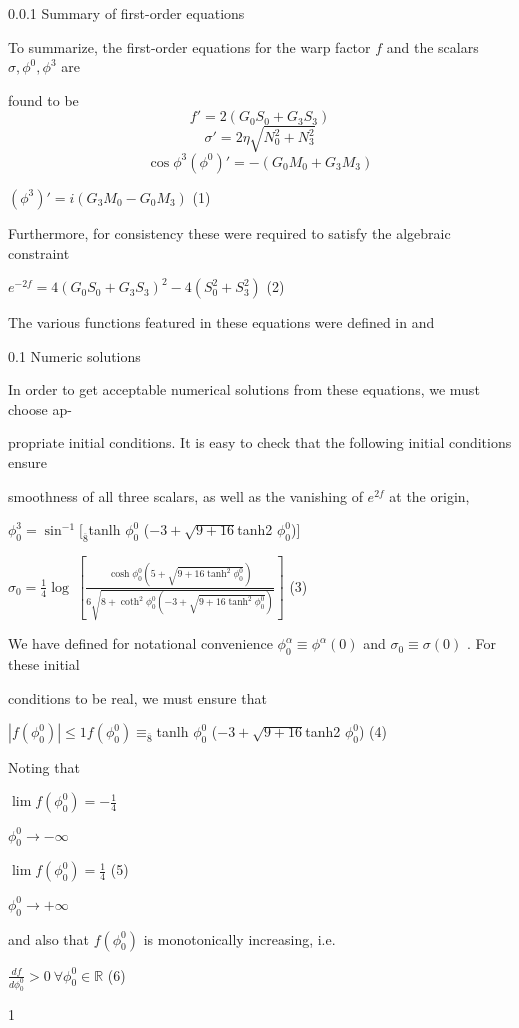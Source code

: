 \documentclass[a4paper,12pt]{article}
\begin{document}
0.0.1 Summary of first-order equations

To summarize, the first-order equations for the warp factor $f$ and the scalars $\sigma, \phi^{0}, \phi^{3}$ are

found to be
$$
f'=2(G_{0}S_{0}+G_{3}S_{3})
$$
$$
\sigma'=2\eta\sqrt{N_{0}^{2}+N_{3}^{2}}
$$
$$
\cos\phi^{3}(\phi^{0})'=-(G_{0}M_{0}+G_{3}M_{3})
$$
\begin{center}
$(\phi^{3})'=i(G_{3}M_{0}-G_{0}M_{3})$   (1)
\end{center}
Furthermore, for consistency these were required to satisfy the algebraic constraint
\begin{center}
$e^{-2f}=4(G_{0}S_{0}+G_{3}S_{3})^{2}-4(S_{0}^{2}+S_{3}^{2})$   (2)
\end{center}
The various functions featured in these equations were defined in and

0.1 Numeric solutions

In order to get acceptable numerical solutions from these equations, we must choose ap-

propriate initial conditions. It is easy to check that the following initial conditions ensure

smoothness of all three scalars, as well as the vanishing of $e^{2f}$ at the origin,

$\phi_{0}^{3}=\sin^{-1} [_{\overline{8}}$tanlh $\phi_{0}^{0}$ ($-3+\sqrt{9+16}$tanh2 $\phi_{0}^{0}$)]
\begin{center}
$\displaystyle \sigma_{0}=\frac{1}{4}\log\ [\frac{\cosh\phi_{0}^{0}(5+\sqrt{9+16\tanh^{2}\phi_{0}^{0}})}{6\sqrt{8+\coth^{2}\phi_{0}^{0}(-3+\sqrt{9+16\tanh^{2}\phi_{0}^{0}})}}]$   (3)
\end{center}
We have defined for notational convenience $\phi_{0}^{\alpha} \equiv \phi^{\alpha}(0)$ and $\sigma_{0} \equiv \sigma(0)$ . For these initial

conditions to be real, we must ensure that
\begin{center}
$|f(\phi_{0}^{0})| \leq 1 f(\phi_{0}^{0})\equiv_{\overline{8}}$tanlh $\phi_{0}^{0}$ ($-3+\sqrt{9+16}$tanh2 $\phi_{0}^{0}$)   (4)
\end{center}
Noting that

$\displaystyle \lim f(\displaystyle \phi_{0}^{0})=-\frac{1}{4}$

$\phi_{0}^{0}\rightarrow-\infty$

$\displaystyle \lim f(\displaystyle \phi_{0}^{0})=\frac{1}{4}$ (5)

$\phi_{0}^{0}\rightarrow+\infty$

and also that $f(\phi_{0}^{0})$ is monotonically increasing, i.e.
\begin{center}
$\displaystyle \frac{df}{d\phi_{0}^{0}}>0\ \forall\phi_{0}^{0}\in \mathbb{R}$   (6)
\end{center}
1
\end{document}
